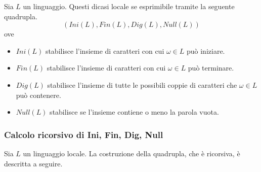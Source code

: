 \documentclass{subfiles}
\begin{document}
\begin{Definition*}
    Sia \(L\) un linguaggio. Questi dicasi locale se esprimibile tramite la seguente quadrupla.
    \[
        (Ini(L), Fin(L), Dig(L), Null(L))
    \]
    ove
    \begin{itemize}
        \item \(Ini(L)\) stabilisce l'insieme di caratteri con cui \(\omega \in L\) può iniziare.
        \item \(Fin(L)\) stabilisce l'insieme di caratteri con cui \(\omega \in L\) può terminare.
        \item \(Dig(L)\) stabilisce l'insieme di tutte le possibili coppie di caratteri che \(\omega \in L\) può contenere.
        \item \(Null(L)\) stabilisce se l'insieme contiene o meno la parola vuota.
    \end{itemize}
\end{Definition*}

\subsubsection{Calcolo ricorsivo di Ini, Fin, Dig, Null}
Sia \(L\) un linguaggio locale. La costruzione della quadrupla, che è ricorsiva, è descritta a seguire.
\end{document}
